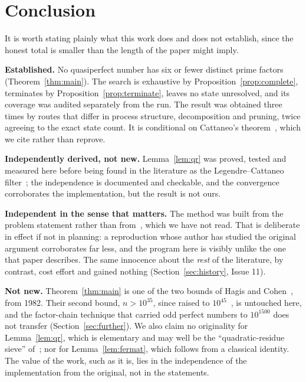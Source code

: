 \documentclass[11pt]{amsart}
\theoremstyle{remark}
\begin{document}
\section{Conclusion}\label{sec:conclusion}

It is worth stating plainly what this work does and does not establish, since the
honest total is smaller than the length of the paper might imply.

\textbf{Established.} No quasiperfect number has six or fewer distinct prime
factors (Theorem~\ref{thm:main}). The search is exhaustive by
Proposition~\ref{prop:complete}, terminates by
Proposition~\ref{prop:terminate}, leaves no state unresolved, and its coverage was
audited separately from the run. The result was obtained three times by routes
that differ in process structure, decomposition and pruning, twice agreeing to the
exact state count. It is conditional on Cattaneo's theorem~\cite{cattaneo}, which
we cite rather than reprove.

\textbf{Independently derived, not new.} Lemma~\ref{lem:qr} was proved, tested and
measured here before being found in the literature as the Legendre--Cattaneo
filter~\cite{ualbf}; the independence is documented and checkable, and the
convergence corroborates the implementation, but the result is not ours.

\textbf{Independent in the sense that matters.} The method was built from the
problem statement rather than from~\cite{hagiscohen}, which we have not read.
That is deliberate in effect if not in planning: a reproduction whose author has
studied the original argument corroborates far less, and the program here is
visibly unlike the one that paper describes. The same innocence about the
\emph{rest} of the literature, by contrast, cost effort and gained nothing
(Section~\ref{sec:history}, Issue 11).

\textbf{Not new.} Theorem~\ref{thm:main} is one of the two bounds of Hagis and
Cohen~\cite{hagiscohen}, from 1982. Their second bound, $n > 10^{35}$, since
raised to $10^{45}$~\cite{alekseyev}, is untouched here, and the factor-chain
technique that carried odd perfect numbers to $10^{1500}$ does not transfer
(Section~\ref{sec:further}). We also claim no originality for
Lemma~\ref{lem:qr}, which is elementary and may well be the
``quadratic-residue sieve'' of~\cite{tty}; nor for Lemma~\ref{lem:fermat}, which
follows from a classical identity. The value of the work, such as it is, lies in
the independence of the implementation from the original, not in the statements.
\end{document}

